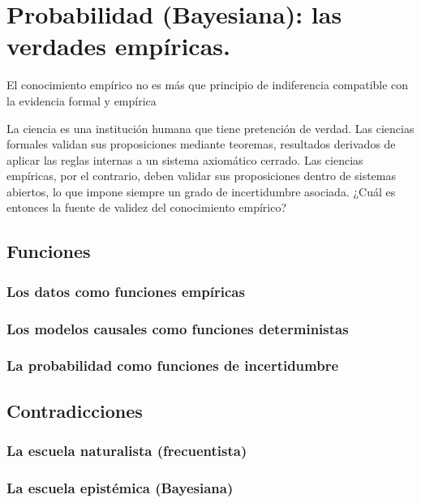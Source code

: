 \documentclass[a4paper,10pt]{book}
\theoremstyle{definition}
\begin{document}
\chapter{Probabilidad (Bayesiana): las verdades empíricas.}

\epigraph{El conocimiento empírico no es más que principio de indiferencia compatible con la evidencia formal y empírica}{}

La ciencia es una institución humana que tiene pretención de verdad.
Las ciencias formales validan sus proposiciones mediante teoremas, resultados derivados de aplicar las reglas internas a un sistema axiomático cerrado.
Las ciencias empíricas, por el contrario, deben validar sus proposiciones dentro de sistemas abiertos, lo que impone siempre un grado de incertidumbre asociada.
¿Cuál es entonces la fuente de validez del conocimiento empírico?


\section{Funciones}

\subsection{Los datos como funciones empíricas}

\subsection{Los modelos causales como funciones deterministas}

\subsection{La probabilidad como funciones de incertidumbre}

\section{Contradicciones}

\subsection{La escuela naturalista (frecuentista)}

\subsection{La escuela epistémica (Bayesiana)}
\end{document}
